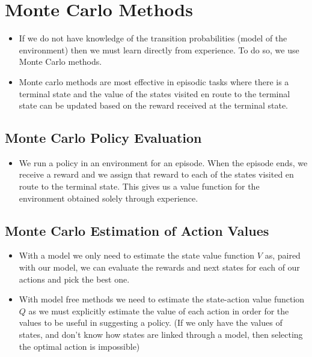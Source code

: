 \section{Monte Carlo Methods}
\begin{itemize}
\item If we do not have knowledge of the transition probabilities (model of the environment) then we must learn directly from experience. To do so, we use Monte Carlo methods.
\item Monte carlo methods are most effective in episodic tasks where there is a terminal state and the value of the states visited en route to the terminal state can be updated based on the reward received at the terminal state.
\end{itemize}

\subsection{Monte Carlo Policy Evaluation}
\begin{itemize}
\item We run a policy in an environment for an episode. When the episode ends, we receive a reward and we assign that reward to each of the states visited en route to the terminal state. This gives us a value function for the environment obtained solely through experience.
\end{itemize}


\subsection{Monte Carlo Estimation of Action Values}
\begin{itemize}
\item With a model we only need to estimate the state value function \(V\) as, paired with our model, we can evaluate the rewards and next states for each of our actions and pick the best one.
\item With model free methods we need to estimate the state-action value function \(Q\) as we must explicitly estimate the value of each action in order for the values to be useful in suggesting a policy. (If we only have the values of states, and don't know how states are linked through a model, then selecting the optimal action is impossible)
\end{itemize}


